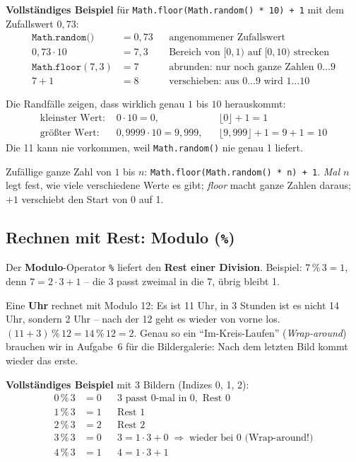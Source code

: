 \documentclass[a4paper,11pt]{article}
\begin{document}
\textbf{Vollständiges Beispiel} für \lstinline|Math.floor(Math.random() * 10) + 1| mit dem Zufallswert $0{,}73$:
\begin{align*}
\texttt{Math.random()} &= 0{,}73 && \text{angenommener Zufallswert}\\
0{,}73 \cdot 10 &= 7{,}3 && \text{Bereich von } [0,1) \text{ auf } [0,10) \text{ strecken}\\
\texttt{Math.floor}(7{,}3) &= 7 && \text{abrunden: nur noch ganze Zahlen } 0 \dots 9\\
7 + 1 &= 8 && \text{verschieben: aus } 0\dots 9 \text{ wird } 1 \dots 10
\end{align*}

Die Randfälle zeigen, dass wirklich genau $1$ bis $10$ herauskommt:
\begin{align*}
\text{kleinster Wert: } & 0 \cdot 10 = 0, && \lfloor 0 \rfloor + 1 = 1\\
\text{größter Wert: }   & 0{,}9999 \cdot 10 = 9{,}999, && \lfloor 9{,}999 \rfloor + 1 = 9 + 1 = 10
\end{align*}
Die 11 kann nie vorkommen, weil \lstinline|Math.random()| nie genau 1 liefert.

\begin{merkbox}
Zufällige ganze Zahl von $1$ bis $n$: \lstinline|Math.floor(Math.random() * n) + 1|.
\emph{Mal $n$} legt fest, wie viele verschiedene Werte es gibt; \emph{floor} macht ganze Zahlen daraus;
\emph{$+1$} verschiebt den Start von 0 auf 1.
\end{merkbox}

\subsection{Rechnen mit Rest: Modulo (\texttt{\%})}\label{sec:modulo}

Der \textbf{Modulo}-Operator \texttt{\%} liefert den \textbf{Rest einer Division}. Beispiel: $7 \,\%\, 3 = 1$, denn
$7 = 2 \cdot 3 + 1$ -- die 3 passt zweimal in die 7, übrig bleibt 1.

\begin{analogie}
Eine \textbf{Uhr} rechnet mit Modulo 12: Es ist 11 Uhr, in 3 Stunden ist es nicht 14 Uhr, sondern 2 Uhr --
nach der 12 geht es wieder von vorne los. $(11 + 3) \,\%\, 12 = 14 \,\%\, 12 = 2$.
Genau so ein "`Im-Kreis-Laufen"' (\emph{Wrap-around}) brauchen wir in Aufgabe~6 für die Bildergalerie:
Nach dem letzten Bild kommt wieder das erste.
\end{analogie}

\textbf{Vollständiges Beispiel} mit 3 Bildern (Indizes 0, 1, 2):
\begin{align*}
0 \,\%\, 3 &= 0 && 3 \text{ passt 0-mal in } 0, \text{ Rest } 0\\
1 \,\%\, 3 &= 1 && \text{Rest } 1\\
2 \,\%\, 3 &= 2 && \text{Rest } 2\\
3 \,\%\, 3 &= 0 && 3 = 1\cdot 3 + 0 \;\Rightarrow\; \text{wieder bei } 0 \text{ (Wrap-around!)}\\
4 \,\%\, 3 &= 1 && 4 = 1\cdot 3 + 1
\end{align*}
\end{document}
